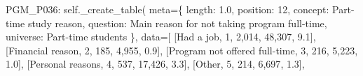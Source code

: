 \documentclass[
  11pt,
  a4paper,
]{article}
\newenvironment{Shaded}{\begin{snugshade}}{\end{snugshade}}
\newcommand{\NormalTok}[1]{\textcolor[rgb]{0.00,0.23,0.31}{#1}}
\newcommand{\OperatorTok}[1]{\textcolor[rgb]{0.37,0.37,0.37}{#1}}
\newcommand{\StringTok}[1]{\textcolor[rgb]{0.13,0.47,0.30}{#1}}
\newcommand{\VariableTok}[1]{\textcolor[rgb]{0.07,0.07,0.07}{#1}}
\begin{document}
\begin{Shaded}
\begin{Highlighting}[]
            \StringTok{\textquotesingle{}PGM\_P036\textquotesingle{}}\NormalTok{: }\VariableTok{self}\NormalTok{.\_create\_table(}
\NormalTok{                meta}\OperatorTok{=}\NormalTok{\{}
                \StringTok{\textquotesingle{}length\textquotesingle{}}\NormalTok{: }\StringTok{\textquotesingle{}1.0\textquotesingle{}}\NormalTok{, }\StringTok{\textquotesingle{}position\textquotesingle{}}\NormalTok{: }\StringTok{\textquotesingle{}12\textquotesingle{}}\NormalTok{,}
                \StringTok{\textquotesingle{}concept\textquotesingle{}}\NormalTok{: }\StringTok{\textquotesingle{}Part{-}time study reason\textquotesingle{}}\NormalTok{,}
                \StringTok{\textquotesingle{}question\textquotesingle{}}\NormalTok{: }\StringTok{\textquotesingle{}Main reason for not taking program full{-}time\textquotesingle{}}\NormalTok{,}
                \StringTok{\textquotesingle{}universe\textquotesingle{}}\NormalTok{: }\StringTok{\textquotesingle{}Part{-}time students\textquotesingle{}}
\NormalTok{                \},}
\NormalTok{                data}\OperatorTok{=}\NormalTok{[}
\NormalTok{                [}\StringTok{\textquotesingle{}Had a job\textquotesingle{}}\NormalTok{, }\StringTok{\textquotesingle{}1\textquotesingle{}}\NormalTok{, }\StringTok{\textquotesingle{}2,014\textquotesingle{}}\NormalTok{, }\StringTok{\textquotesingle{}48,307\textquotesingle{}}\NormalTok{, }\StringTok{\textquotesingle{}9.1\textquotesingle{}}\NormalTok{],}
\NormalTok{                [}\StringTok{\textquotesingle{}Financial reason\textquotesingle{}}\NormalTok{, }\StringTok{\textquotesingle{}2\textquotesingle{}}\NormalTok{, }\StringTok{\textquotesingle{}185\textquotesingle{}}\NormalTok{, }\StringTok{\textquotesingle{}4,955\textquotesingle{}}\NormalTok{, }\StringTok{\textquotesingle{}0.9\textquotesingle{}}\NormalTok{],}
\NormalTok{                [}\StringTok{\textquotesingle{}Program not offered full{-}time\textquotesingle{}}\NormalTok{, }\StringTok{\textquotesingle{}3\textquotesingle{}}\NormalTok{, }\StringTok{\textquotesingle{}216\textquotesingle{}}\NormalTok{, }\StringTok{\textquotesingle{}5,223\textquotesingle{}}\NormalTok{, }\StringTok{\textquotesingle{}1.0\textquotesingle{}}\NormalTok{],}
\NormalTok{                [}\StringTok{\textquotesingle{}Personal reasons\textquotesingle{}}\NormalTok{, }\StringTok{\textquotesingle{}4\textquotesingle{}}\NormalTok{, }\StringTok{\textquotesingle{}537\textquotesingle{}}\NormalTok{, }\StringTok{\textquotesingle{}17,426\textquotesingle{}}\NormalTok{, }\StringTok{\textquotesingle{}3.3\textquotesingle{}}\NormalTok{],}
\NormalTok{                [}\StringTok{\textquotesingle{}Other\textquotesingle{}}\NormalTok{, }\StringTok{\textquotesingle{}5\textquotesingle{}}\NormalTok{, }\StringTok{\textquotesingle{}214\textquotesingle{}}\NormalTok{, }\StringTok{\textquotesingle{}6,697\textquotesingle{}}\NormalTok{, }\StringTok{\textquotesingle{}1.3\textquotesingle{}}\NormalTok{],}

\end{Highlighting}
\end{Shaded}
\end{document}
